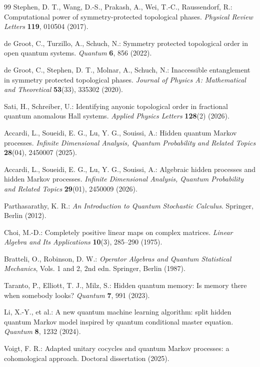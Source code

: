 \documentclass[12pt,a4paper]{article}
\begin{document}
\begin{thebibliography}{99}
Stephen, D. T., Wang, D.-S., Prakash, A., Wei, T.-C., Raussendorf, R.:
Computational power of symmetry-protected topological phases.
\textit{Physical Review Letters} \textbf{119}, 010504 (2017).

de Groot, C., Turzillo, A., Schuch, N.:
Symmetry protected topological order in open quantum systems.
\textit{Quantum} \textbf{6}, 856 (2022).

de Groot, C., Stephen, D. T., Molnar, A., Schuch, N.:
Inaccessible entanglement in symmetry protected topological phases.
\textit{Journal of Physics A: Mathematical and Theoretical} \textbf{53}(33), 335302 (2020).

Sati, H., Schreiber, U.:
Identifying anyonic topological order in fractional quantum anomalous Hall systems.
\textit{Applied Physics Letters} \textbf{128}(2) (2026).

Accardi, L., Soueidi, E. G., Lu, Y. G., Souissi, A.:
Hidden quantum Markov processes.
\textit{Infinite Dimensional Analysis, Quantum Probability and Related Topics}
\textbf{28}(04), 2450007 (2025).

Accardi, L., Soueidi, E. G., Lu, Y. G., Souissi, A.:
Algebraic hidden processes and hidden Markov processes.
\textit{Infinite Dimensional Analysis, Quantum Probability and Related Topics}
\textbf{29}(01), 2450009 (2026).

Parthasarathy, K. R.:
\textit{An Introduction to Quantum Stochastic Calculus}.
Springer, Berlin (2012).

Choi, M.-D.:
Completely positive linear maps on complex matrices.
\textit{Linear Algebra and Its Applications} \textbf{10}(3), 285–290 (1975).

Bratteli, O., Robinson, D. W.:
\textit{Operator Algebras and Quantum Statistical Mechanics}, Vols. 1 and 2, 2nd edn.
Springer, Berlin (1987).

Taranto, P., Elliott, T. J., Milz, S.:
Hidden quantum memory: Is memory there when somebody looks?
\textit{Quantum} \textbf{7}, 991 (2023).

Li, X.-Y., et al.:
A new quantum machine learning algorithm: split hidden quantum Markov model inspired by quantum conditional master equation.
\textit{Quantum} \textbf{8}, 1232 (2024).

Voigt, F. R.:
Adapted unitary cocycles and quantum Markov processes: a cohomological approach.
Doctoral dissertation (2025).


\end{thebibliography}
\end{document}
